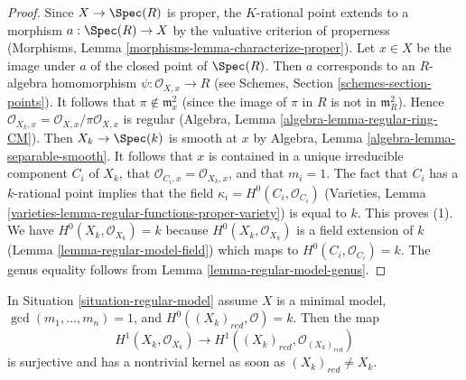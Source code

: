 \begin{proof}
Since $X \to \Spec(R)$ is proper, the $K$-rational point extends to
a morphism $a : \Spec(R) \to X$ by the valuative criterion of properness
(Morphisms, Lemma \ref{morphisms-lemma-characterize-proper}).
Let $x \in X$ be the image under $a$ of the closed point of $\Spec(R)$.
Then $a$ corresponds to an $R$-algebra homomorphism
$\psi : \mathcal{O}_{X, x} \to R$
(see Schemes, Section \ref{schemes-section-points}).
It follows that $\pi \not \in \mathfrak m_x^2$ (since the image
of $\pi$ in $R$ is not in $\mathfrak m_R^2$).
Hence $\mathcal{O}_{X_k, x} = \mathcal{O}_{X, x}/\pi \mathcal{O}_{X, x}$
is regular (Algebra, Lemma \ref{algebra-lemma-regular-ring-CM}).
Then $X_k \to \Spec(k)$ is smooth at $x$ by
Algebra, Lemma \ref{algebra-lemma-separable-smooth}.
It follows that $x$ is contained in a unique irreducible component
$C_i$ of $X_k$, that $\mathcal{O}_{C_i, x} = \mathcal{O}_{X_k, x}$,
and that $m_i = 1$. The fact that $C_i$ has a
$k$-rational point implies that the field
$\kappa_i = H^0(C_i, \mathcal{O}_{C_i})$
(Varieties, Lemma \ref{varieties-lemma-regular-functions-proper-variety})
is equal to $k$. This proves (1). We have
$H^0(X_k, \mathcal{O}_{X_k}) = k$
because $H^0(X_k, \mathcal{O}_{X_k})$ is a field
extension of $k$ (Lemma \ref{lemma-regular-model-field})
which maps to $H^0(C_i, \mathcal{O}_{C_i}) = k$.
The genus equality follows from Lemma \ref{lemma-regular-model-genus}.
\end{proof}

\begin{lemma}
\label{lemma-genus-reduction-smaller}
In Situation \ref{situation-regular-model} assume $X$ is a minimal model,
$\gcd(m_1, \ldots, m_n) = 1$, and $H^0((X_k)_{red}, \mathcal{O}) = k$. Then
the map
$$
H^1(X_k, \mathcal{O}_{X_k}) \to H^1((X_k)_{red}, \mathcal{O}_{(X_k)_{red}})
$$
is surjective and has a nontrivial kernel as soon as $(X_k)_{red} \not = X_k$.
\end{lemma}

